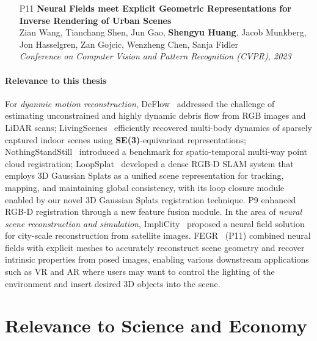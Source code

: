 \begin{itemize}
    \item [P11] \noindent\textbf{ Neural Fields meet Explicit Geometric Representations for Inverse Rendering of Urban Scenes} \\[0.5em]
    Zian Wang, Tianchang Shen, Jun Gao, \textbf{Shengyu Huang}, Jacob Munkberg, Jon Hasselgren, Zan Gojcic, Wenzheng Chen, Sanja Fidler \\
    \textit{Conference on Computer Vision and Pattern Recognition (CVPR), 2023}

\end{itemize}

\paragraph{Relevance to this thesis} For \textit{dyanmic motion reconstruction}, DeFlow~\cite{Zhu_2023_CVPR} addressed the challenge of estimating unconstrained and highly dynamic debris flow from RGB images and LiDAR scans; LivingScenes~\cite{zhu2023living} efficiently recovered multi-body dynamics of sparsely captured indoor scenes using \textbf{SE(3)}-equivariant representations; NothingStandStill~\cite{sun2023nothing} introduced a benchmark for spatio-temporal multi-way point cloud registration; LoopSplat~\cite{zhu2024_loopsplat} developed a dense RGB-D SLAM system that employs 3D Gaussian Splats as a unified scene representation for tracking, mapping, and maintaining global consistency, with its loop closure module enabled by our novel 3D Gaussian Splats registration technique. P9 enhanced RGB-D registration through a new feature fusion module. In the area of \textit{neural scene reconstruction and simulation}, ImpliCity~\cite{stucker2022implicity} proposed a neural field solution for city-scale reconstruction from satellite images. FEGR~\cite{wang2023fegr} (P11) combined neural fields with explicit meshes to accurately reconstruct scene geometry and recover intrinsic properties from posed images, enabling various downstream applications such as VR and AR where users may want to control the lighting of the environment and insert desired 3D objects into the scene.


\section{Relevance to Science and Economy}

